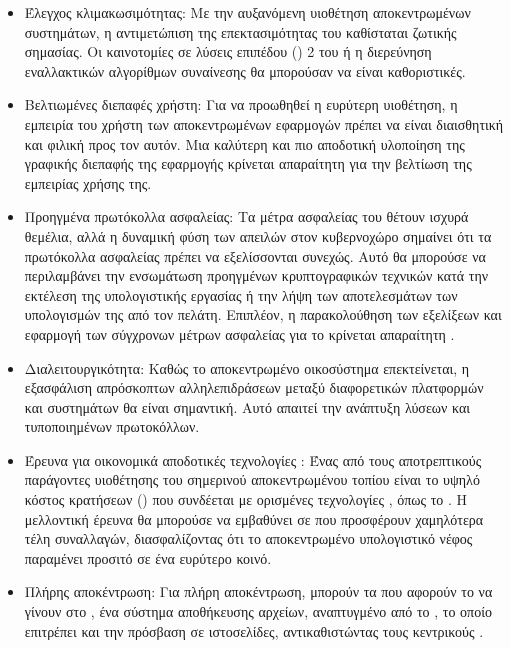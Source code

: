 \begin{itemize}
\item Έλεγχος κλιμακωσιμότητας: Με την αυξανόμενη υιοθέτηση αποκεντρωμένων συστημάτων, η αντιμετώπιση της επεκτασιμότητας του  καθίσταται ζωτικής σημασίας. Οι καινοτομίες σε λύσεις επιπέδου () 2 του  ή η διερεύνηση εναλλακτικών αλγορίθμων συναίνεσης θα μπορούσαν να είναι καθοριστικές.
\item Βελτιωμένες διεπαφές χρήστη: Για να προωθηθεί η ευρύτερη υιοθέτηση, η εμπειρία του χρήστη των αποκεντρωμένων εφαρμογών πρέπει να είναι διαισθητική και φιλική προς τον αυτόν. Μια καλύτερη και πιο αποδοτική υλοποίηση της γραφικής διεπαφής της εφαρμογής κρίνεται απαραίτητη για την βελτίωση της εμπειρίας χρήσης της.
\item Προηγμένα πρωτόκολλα ασφαλείας: Τα μέτρα ασφαλείας του  θέτουν ισχυρά θεμέλια, αλλά η δυναμική φύση των απειλών στον κυβερνοχώρο σημαίνει ότι τα πρωτόκολλα ασφαλείας πρέπει να εξελίσσονται συνεχώς. Αυτό θα μπορούσε να περιλαμβάνει την ενσωμάτωση προηγμένων κρυπτογραφικών τεχνικών κατά την εκτέλεση της υπολογιστικής εργασίας ή την λήψη των αποτελεσμάτων των υπολογισμών της από τον πελάτη. Επιπλέον, η παρακολούθηση των εξελίξεων και εφαρμογή των σύγχρονων μέτρων ασφαλείας για το  κρίνεται απαραίτητη \cite{ref46,ref47}.
\item Διαλειτουργικότητα: Καθώς το αποκεντρωμένο οικοσύστημα επεκτείνεται, η εξασφάλιση απρόσκοπτων αλληλεπιδράσεων μεταξύ διαφορετικών πλατφορμών και συστημάτων  θα είναι σημαντική. Αυτό απαιτεί την ανάπτυξη λύσεων  και τυποποιημένων πρωτοκόλλων.
\item Έρευνα για οικονομικά αποδοτικές τεχνολογίες : Ένας από τους αποτρεπτικούς παράγοντες υιοθέτησης του σημερινού αποκεντρωμένου τοπίου είναι το υψηλό κόστος κρατήσεων ()  που συνδέεται με ορισμένες τεχνολογίες , όπως το . Η μελλοντική έρευνα θα μπορούσε να εμβαθύνει σε  που προσφέρουν χαμηλότερα τέλη συναλλαγών, διασφαλίζοντας ότι το αποκεντρωμένο υπολογιστικό νέφος παραμένει προσιτό σε ένα ευρύτερο κοινό.
\item Πλήρης αποκέντρωση: Για πλήρη αποκέντρωση, μπορούν τα  που αφορούν το  να γίνουν  στο , ένα  σύστημα αποθήκευσης αρχείων, αναπτυγμένο από το , το οποίο επιτρέπει και την πρόσβαση σε ιστοσελίδες, αντικαθιστώντας τους κεντρικούς  \cite{ref45}.
\end{itemize}



